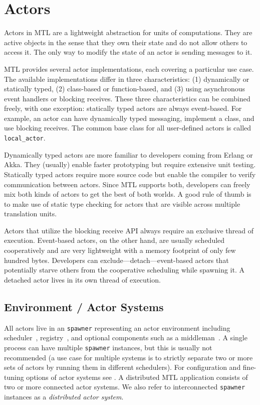 \section{Actors}
\label{actor}

Actors in MTL are a lightweight abstraction for units of computations. They
are active objects in the sense that they own their state and do not allow
others to access it. The only way to modify the state of an actor is sending
messages to it.

MTL provides several actor implementations, each covering a particular use
case. The available implementations differ in three characteristics: (1)
dynamically or statically typed, (2) class-based or function-based, and (3)
using asynchronous event handlers or blocking receives. These three
characteristics can be combined freely, with one exception: statically typed
actors are always event-based. For example, an actor can have dynamically typed
messaging, implement a class, and use blocking receives. The common base class
for all user-defined actors is called \lstinline^local_actor^.

Dynamically typed actors are more familiar to developers coming from Erlang or
Akka. They (usually) enable faster prototyping but require extensive unit
testing. Statically typed actors require more source code but enable the
compiler to verify communication between actors. Since MTL supports both,
developers can freely mix both kinds of actors to get the best of both worlds.
A good rule of thumb is to make use of static type checking for actors that are
visible across multiple translation units.

Actors that utilize the blocking receive API always require an exclusive thread
of execution. Event-based actors, on the other hand, are usually scheduled
cooperatively and are very lightweight with a memory footprint of only few
hundred bytes. Developers can exclude---detach---event-based actors that
potentially starve others from the cooperative scheduling while spawning it. A
detached actor lives in its own thread of execution.

\subsection{Environment / Actor Systems}
\label{actor-system}

All actors live in an \lstinline^spawner^ representing an actor
environment including scheduler~, registry~, and
optional components such as a middleman~. A single process can
have multiple \lstinline^spawner^ instances, but this is usually not
recommended (a use case for multiple systems is to strictly separate two or
more sets of actors by running them in different schedulers). For configuration
and fine-tuning options of actor systems see . A
distributed MTL application consists of two or more connected actor systems. We
also refer to interconnected \lstinline^spawner^ instances as a
\emph{distributed actor system}.


